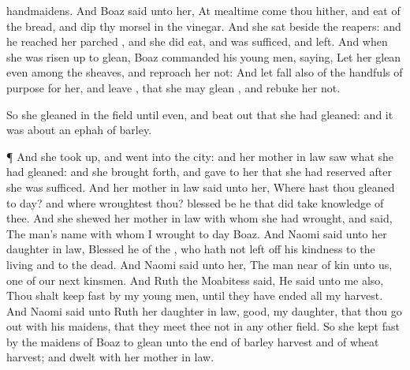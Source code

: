 {handmaidens.
And
Boaz
said unto her, At
mealtime
come thou
hither, and
eat of the
bread, and
dip thy
morsel in the
vinegar. And she
sat
beside the
reapers: and he
reached her
parched
{}, and she did
eat, and was
sufficed, and
left.
And when she was risen
up to
glean,
Boaz
commanded his young
men,
saying, Let her
glean even among the
sheaves, and
reproach her not:
And let
fall also
{} of the
handfuls of
purpose for her, and
leave
{}, that she may
glean
{}, and
rebuke her not.
\par }{\PP {}So she
gleaned in the
field until
even, and beat
out that she had
gleaned: and it was about an
ephah of
barley.
\par }{\PP {}¶ And she took
{}
up, and
went into the
city: and her mother in
law
saw what she had
gleaned: and she brought
forth, and
gave to her that she had
reserved after she was
sufficed.
And her mother in
law
said unto her, Where hast thou
gleaned to
day? and
where
wroughtest thou?
blessed be he that did take
knowledge of thee. And she
shewed her mother in
law with whom she had
wrought, and
said, The
man’s
name with whom I
wrought to
day
{}
Boaz.
And
Naomi
said unto her daughter in
law,
Blessed
{} he of the
{}, who hath not left
off his
kindness to the
living and to the
dead. And
Naomi
said unto her, The
man
{} near of
kin unto us, one of our next
kinsmen.
And
Ruth the
Moabitess
said, He
said unto me also, Thou shalt keep
fast by my young
men, until they have
ended all my
harvest.
And
Naomi
said unto
Ruth her daughter in
law,
{}
good, my
daughter, that thou go
out with his
maidens, that they
meet thee not in any
other
field.
So she kept
fast by the
maidens of
Boaz to
glean unto the
end of
barley
harvest and of
wheat
harvest; and
dwelt with her mother in
law.

}
